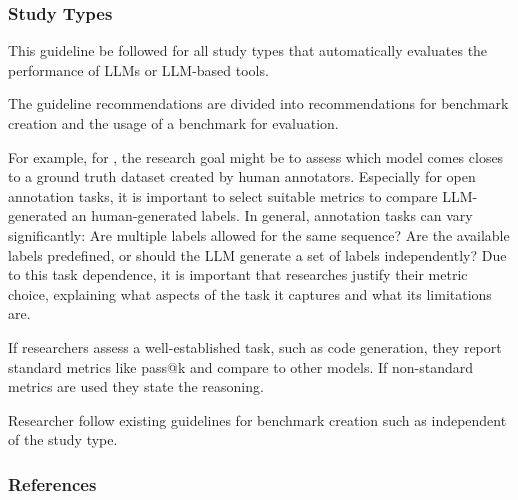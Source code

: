 \subsubsection{Study Types}

This guideline \must be followed for all study types that automatically evaluates the performance of LLMs or LLM-based tools.

The guideline recommendations are divided into recommendations for benchmark creation and the usage of a benchmark for evaluation.

For example, for \annotators, the research goal might be to assess which model comes closes to a ground truth dataset created by human annotators.
Especially for open annotation tasks, it is important to select suitable metrics to compare LLM-generated an human-generated labels.
In general, annotation tasks can vary significantly: Are multiple labels allowed for the same sequence? Are the available labels predefined, or should the LLM generate a set of labels independently?
Due to this task dependence, it is important that researches justify their metric choice, explaining what aspects of the task it captures and what its limitations are.

If researchers assess a well-established task, such as code generation, they \should report standard metrics like pass@k and compare to other models.
If non-standard metrics are used they \must state the reasoning.

Researcher \should follow existing guidelines for benchmark creation such as \cite{cao2025should} independent of the study type.



\subsubsection{References}







